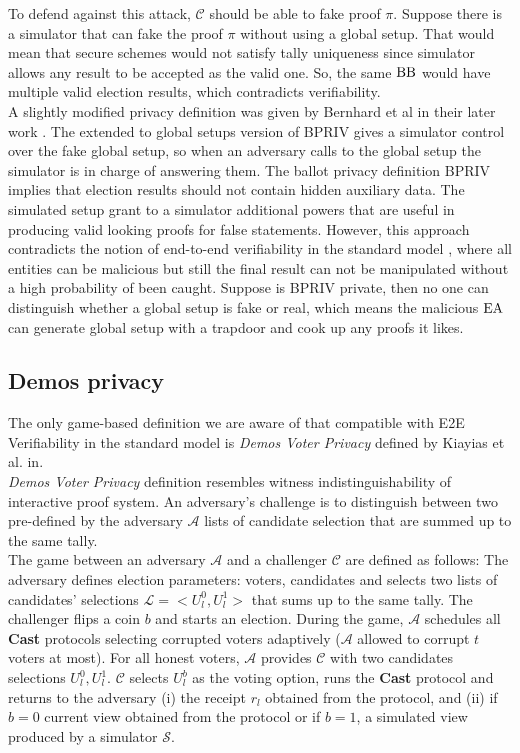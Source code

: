 To defend against this attack, $\mathcal{C}$ should be able to fake proof $\pi$. Suppose there is a simulator that can fake the proof $\pi$ without using a global setup. That would mean that secure schemes would not satisfy tally uniqueness since simulator allows any result to be accepted as the valid one. So, the same $\operatorname{BB}$ would have multiple valid election results, which contradicts verifiability. \\ 

A slightly modified privacy definition was given by Bernhard et al in their later work \cite{Bernhard2015}. The extended to global setups version of BPRIV gives a simulator control over the fake global setup, so when an adversary calls to the global setup the simulator is in charge of answering them. The ballot privacy definition BPRIV implies that election results should not contain hidden auxiliary data. The simulated setup grant to a simulator additional powers that are useful in producing valid looking proofs for false statements. However, this approach contradicts the notion of end-to-end verifiability in the standard model \cite{Kiayias2015a}, where all entities can be malicious but still the final result can not be manipulated without a high probability of been caught. Suppose is BPRIV private, then no one can distinguish whether a global setup is fake or real, which means the malicious $\operatorname{EA}$ can generate global setup with a trapdoor and cook up any proofs it likes. 

 \subsection{Demos privacy}
 The only game-based definition we are aware of that compatible with E2E Verifiability in the standard model is \textit{Demos Voter Privacy} defined by Kiayias et al. in\cite{Kiayias2015a}. \\
 
 \textit{Demos Voter Privacy} definition resembles witness indistinguishability of interactive proof system. An adversary's challenge is to distinguish between two pre-defined by the adversary  $\mathcal{A}$ lists of candidate selection that are summed up  to the same tally. \\
 
 The game between an adversary $\mathcal{A}$ and a challenger $\mathcal{C}$ are defined as follows: The adversary defines election parameters: voters, candidates and selects two lists of candidates' selections $\mathcal{L} = <U_l^0, U_l^1>$  that sums up to the same tally. The challenger flips a coin $b$ and starts an election. During the game,   $\mathcal{A}$ schedules all \textbf{Cast} protocols selecting corrupted voters adaptively ($\mathcal{A}$ allowed to corrupt $t$ voters at most). For all honest voters,  $\mathcal{A}$ provides $\mathcal{C}$ with two candidates selections $U_l^0, U_l^1$. $\mathcal{C}$ selects $U_l^b$ as the voting option, runs the \textbf{Cast}  protocol and returns to the adversary (i) the receipt $r_l$ obtained from the protocol, and (ii) if $b = 0$ current view obtained from the protocol or if $b =1$, a simulated view produced by a simulator $\mathcal{S}$. \\
 
